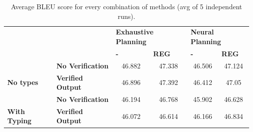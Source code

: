 \begin{table}[b]
\begin{center}
\begin{tabular}{ll|c|c|c|c|}
\cline{3-6}
  &                     & \multicolumn{2}{l|}{\textbf{Exhaustive Planning}}                        & \multicolumn{2}{l|}{\textbf{Neural Planning}}                         \\ \cline{3-6} 
  &                     & \multicolumn{1}{l|}{\textbf{-}} & \multicolumn{1}{l|}{\textbf{REG}} & \multicolumn{1}{l|}{\textbf{-}} & \multicolumn{1}{l|}{\textbf{REG}} \\ \hline
\multicolumn{1}{|l|}{}                                        & \textbf{No Verification}     & \cellcolor[HTML]{D4CE70}46.882  & \cellcolor[HTML]{64BF86}47.338    & \cellcolor[HTML]{F7C266}46.506  & \cellcolor[HTML]{ABC973}47.124      \\ \cline{2-6} 
\multicolumn{1}{|l|}{\multirow{-2}{*}{\textbf{No types}}}          & \textbf{Verified Output} & \cellcolor[HTML]{D1CF67}46.896  & \cellcolor[HTML]{56BD85}47.392    & \cellcolor[HTML]{FDB070}46.412  & \cellcolor[HTML]{75C083}47.05       \\ \hline
\multicolumn{1}{|l|}{}                                        & \textbf{No Verification}     & \cellcolor[HTML]{E79072}46.194  & \cellcolor[HTML]{EDD56A}46.768    & \cellcolor[HTML]{E47D75}45.902  & \cellcolor[HTML]{FBCD6B}46.628      \\ \cline{2-6} 
\multicolumn{1}{|l|}{\multirow{-2}{*}{\textbf{With Typing}}} & \textbf{Verified Output} & \cellcolor[HTML]{E67C73}46.072  & \cellcolor[HTML]{FCCC6A}46.614    & \cellcolor[HTML]{EC9B6E}46.166  & \cellcolor[HTML]{DDD270}46.834      \\ \hline
\end{tabular}
\end{center}
\caption{Average BLEU score for every combination of methods (avg of 5 independent runs).}
\label{table:bleu}
\end{table}